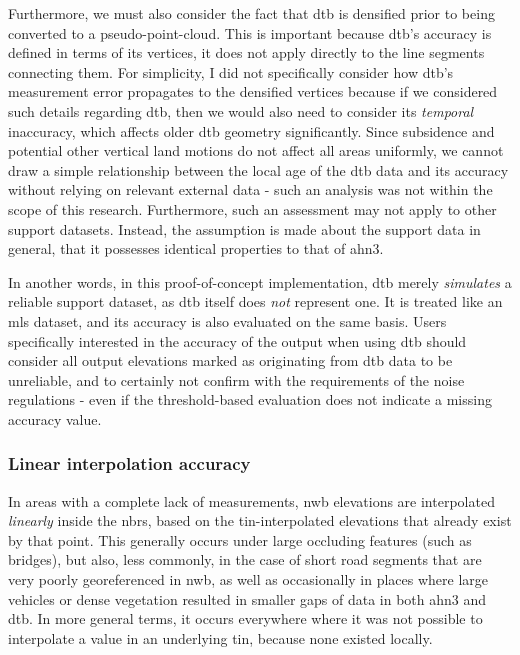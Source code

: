 Furthermore, we must also consider the fact that \ac{dtb} is densified prior to being converted to a pseudo-point-cloud. This is important because \ac{dtb}'s accuracy is defined in terms of its vertices, it does not apply directly to the line segments connecting them. For simplicity, I did not specifically consider how \ac{dtb}'s measurement error propagates to the densified vertices because if we considered such details regarding \ac{dtb}, then we would also need to consider its \textit{temporal} inaccuracy, which affects older \ac{dtb} geometry significantly. Since subsidence and potential other vertical land motions do not affect all areas uniformly, we cannot draw a simple relationship between the local age of the \ac{dtb} data and its accuracy without relying on relevant external data - such an analysis was not within the scope of this research. Furthermore, such an assessment may not apply to other support datasets. Instead, the assumption is made about the support data in general, that it possesses identical properties to that of \ac{ahn3}.

In another words, in this proof-of-concept implementation, \ac{dtb} merely \textit{simulates} a reliable support dataset, as \ac{dtb} itself does \textit{not} represent one. It is treated like an \ac{mls} dataset, and its accuracy is also evaluated on the same basis. Users specifically interested in the accuracy of the output when using \ac{dtb} should consider all output elevations marked as originating from \ac{dtb} data to be unreliable, and to certainly not confirm with the requirements of the noise regulations - even if the threshold-based evaluation does not indicate a missing accuracy value.

\subsubsection{Linear interpolation accuracy}

In areas with a complete lack of measurements, \ac{nwb} elevations are interpolated \textit{linearly} inside the \ac{nbrs}, based on the \ac{tin}-interpolated elevations that already exist by that point. This generally occurs under large occluding features (such as bridges), but also, less commonly, in the case of short road segments that are very poorly georeferenced in \ac{nwb}, as well as occasionally in places where large vehicles or dense vegetation resulted in smaller gaps of data in both \ac{ahn3} and \ac{dtb}. In more general terms, it occurs everywhere where it was not possible to interpolate a value in an underlying \ac{tin}, because none existed locally.

